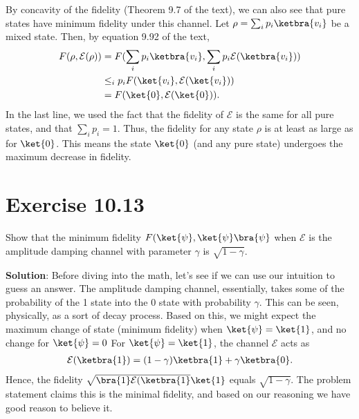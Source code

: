 \documentclass{book}
\newcommand{\mc}[1]{\mathcal{#1}}
\begin{document}
    By concavity of the fidelity (Theorem 9.7 of the text), we can also see that pure states have minimum fidelity under this channel. Let $\rho = \sum_i p_i \ketbra{v_i}$ be a mixed state. Then, by equation 9.92 of the text,
    \begin{align}
    \begin{aligned}
        F(\rho, \mathcal{E}(\rho)) &= F(\sum_i p_i \ketbra{v_i}, \sum_i p_i \mathcal{E}(\ketbra{v_i})) \\
        &\leq_i p_i F(\ket{v_i}, \mathcal{E}(\ket{v_i})) \\
        &= F(\ket{0}, \mathcal{E}(\ket{0})).
    \end{aligned}
    \end{align}
    In the last line, we used the fact that the fidelity of $\mathcal{E}$ is the same for all pure states, and that $\sum_i p_i = 1$. Thus, the fidelity for any state $\rho$ is at least as large as for $\ket{0}$. This means the state $\ket{0}$ (and any pure state) undergoes the maximum decrease in fidelity.
    

\section*{Exercise 10.13}
    Show that the minimum fidelity $F(\ket{\psi}, \mc{\ket{\psi}\bra{\psi}}$ when $\mc{E}$ is the amplitude damping channel with parameter $\gamma$ is $\sqrt{1-\gamma}$.

    \textbf{Solution}: Before diving into the math, let's see if we can use our intuition to guess an answer. The amplitude damping channel, essentially, takes some of the probability of the 1 state into the 0 state with probability $\gamma$. This can be seen, physically, as a sort of decay process. Based on this, we might expect the maximum change of state (minimum fidelity) when $\ket{\psi} = \ket{1}$, and no change for $\ket{\psi} = 0$ For $\ket{\psi} = \ket{1}$, the channel $\mathcal{E}$ acts as
    \begin{align}
        \mathcal{E}(\ketbra{1}) = (1-\gamma) \ketbra{1} + \gamma \ketbra{0}.
    \end{align}
    Hence, the fidelity $\sqrt{\bra{1}\mathcal{E}(\ketbra{1}}\ket{1}$ equals $\sqrt{1-\gamma}$. The problem statement claims this is the minimal fidelity, and based on our reasoning we have good reason to believe it.
\end{document}

